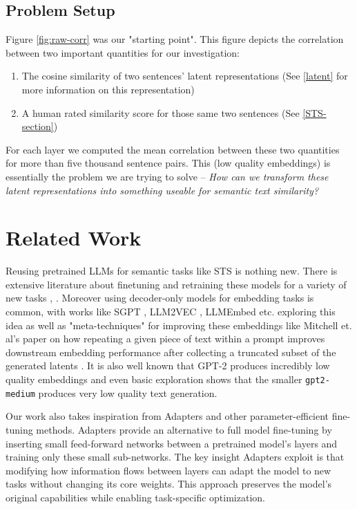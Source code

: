 \documentclass{article}
\begin{document}
\subsection{Problem Setup} \label{Setup}
Figure \ref{fig:raw-corr} was our "starting point". This figure depicts the correlation between two important quantities for our investigation:
\begin{enumerate}
    \item The cosine similarity of two sentences' latent representations (See \ref{latent} for more information on this representation)
    \item A human rated similarity score for those same two sentences (See \ref{STS-section})
\end{enumerate}
For each layer we computed the mean correlation between these two quantities for more than five thousand sentence pairs. This (low quality embeddings) is essentially the problem we are trying to solve -- \textit{How can we transform these latent representations into something useable for semantic text similarity?}

\section{Related Work}
Reusing pretrained LLMs for semantic tasks like STS is nothing new. There is extensive literature about finetuning and retraining
these models for a variety of new tasks \cite{reimers2019sentencebertsentenceembeddingsusing}, \cite{tang2024poolingattentioneffectivedesigns}. Moreover using decoder-only models for embedding tasks is common, with works like
SGPT \cite{muennighoff2022sgptgptsentenceembeddings}, LLM2VEC \cite{LLM2Vec}, LLMEmbed \cite{LLMEmbed} etc. exploring this idea as well as "meta-techniques" for improving these embeddings like Mitchell et. al's paper on how repeating a given piece of text within a prompt improves downstream embedding performance after collecting a truncated subset of the generated latents \cite{RepImprovesLLM}. It is also well known that GPT-2 produces incredibly low quality embeddings \cite{ethayarajh2019contextualcontextualizedwordrepresentations} and even basic exploration shows that the smaller \verb|gpt2-medium| produces very low quality text generation.

Our work also takes inspiration from Adapters \cite{houlsby2019parameterefficienttransferlearningnlp} and other parameter-efficient fine-tuning methods. Adapters provide an alternative to full model fine-tuning by inserting small feed-forward networks between a pretrained model's layers and training only these small sub-networks. The key insight Adapters exploit is that modifying how information flows between layers can adapt the model to new tasks without changing its core weights. This approach preserves the model's original capabilities while enabling task-specific optimization. 
\end{document}
